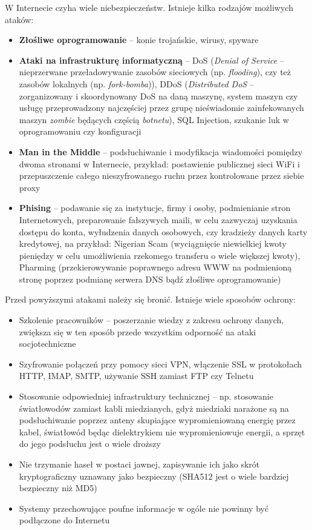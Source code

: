 W Internecie czyha wiele niebezpieczeństw. Istnieje kilka rodzajów możliwych ataków:
\begin{itemize}
	\item \textbf{Złośliwe oprogramowanie} -- konie trojańskie, wirusy, spyware
    \item \textbf{Ataki na infrastrukturę informatyczną} -- DoS (\textit{Denial of Service} -- nieprzerwane przeładowywanie zasobów sieciowych (np. \textit{flooding}), czy też zasobów lokalnych (np. \textit{fork-bomba})), DDoS (\textit{Distributed DoS} -- zorganizowany i skoordynowany DoS na daną maszynę, system maszyn czy usługę przeprowadzony najczęściej przez grupę nieświadomie zainfekowanych maszyn \textit{zombie} będących częścią \textit{botnetu}), SQL Injection, szukanie luk w oprogramowaniu czy konfiguracji
    \item \textbf{Man in the Middle} -- podsłuchiwanie i modyfikacja wiadomości pomiędzy dwoma stronami w Internecie, przykład: postawienie publicznej sieci WiFi i przepuszczenie całego nieszyfrowanego ruchu przez kontrolowane przez siebie proxy
    \item \textbf{Phising} -- podawanie się za instytucje, firmy i osoby, podmienianie stron Internetowych, preparowanie fałszywych maili, w celu zazwyczaj uzyskania dostępu do konta, wyłudzenia danych osobowych, czy kradzieży danych karty kredytowej, na przykład: Nigerian Scam (wyciągnięcie niewielkiej kwoty pieniędzy w celu umożliwienia rzekomego transferu o wiele większej kwoty), Pharming (przekierowywanie poprawnego adresu WWW na podmienioną stronę poprzez podmianę serwera DNS bądź złośliwe oprogramowanie)
\end{itemize}

Przed powyższymi atakami należy się bronić. Istnieje wiele sposobów ochrony:
\begin{itemize}
	\item Szkolenie pracowników -- poszerzanie wiedzy z zakresu ochrony danych, zwiększa się w ten sposób przede wszystkim odporność na ataki socjotechniczne
    \item Szyfrowanie połączeń przy pomocy sieci VPN, włączenie SSL w protokołach HTTP, IMAP, SMTP, używanie SSH zamiast FTP czy Telnetu
    \item Stosowanie odpowiedniej infrastruktury technicznej -- np. stosowanie światłowodów zamiast kabli miedzianych, gdyż miedziaki narażone są na podsłuchiwanie poprzez anteny skupiające wypromieniowaną energię przez kabel, światłowód będąc dielektrykiem nie wypromieniowuje energii, a sprzęt do jego podsłuchu jest o wiele droższy
    \item Nie trzymanie haseł w postaci jawnej, zapisywanie ich jako skrót kryptograficzny uznawany jako bezpieczny (SHA512 jest o wiele bardziej bezpieczny niż MD5)
    \item Systemy przechowujące poufne informacje w ogóle nie powinny być podłączone do Internetu
\end{itemize}

